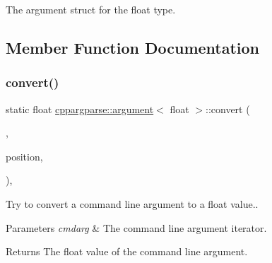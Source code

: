 The argument struct for the float type. 

\subsection{Member Function Documentation}
\mbox{\label{structcppargparse_1_1argument_3_01float_01_4_a3dd5dba91fc35f277138619066d7db24}} 
\subsubsection{\texorpdfstring{convert()}{convert()}}
{\footnotesize\ttfamily static float \hyperlink{structcppargparse_1_1argument}{cppargparse\+::argument}$<$ float $>$\+::convert (\begin{DoxyParamCaption}\item[{const types\+::\+Command\+Line\+\_\+t \&}]{,  }\item[{const types\+::\+Command\+Line\+Position\+\_\+t \&}]{position,  }\item[{const types\+::\+Command\+Line\+Arguments\+\_\+t \&}]{ }\end{DoxyParamCaption})\hspace{0.3cm}{\ttfamily [inline]}, {\ttfamily [static]}}



Try to convert a command line argument to a float value.. 


\begin{DoxyParams}{Parameters}
{\em cmdarg} & The command line argument iterator.\\
\hline
\end{DoxyParams}
\begin{DoxyReturn}{Returns}
The float value of the command line argument. 
\end{DoxyReturn}
\mbox{\label{structcppargparse_1_1argument_3_01float_01_4_a6c02321d1fcc25ffa950948ab642e64f}} 
